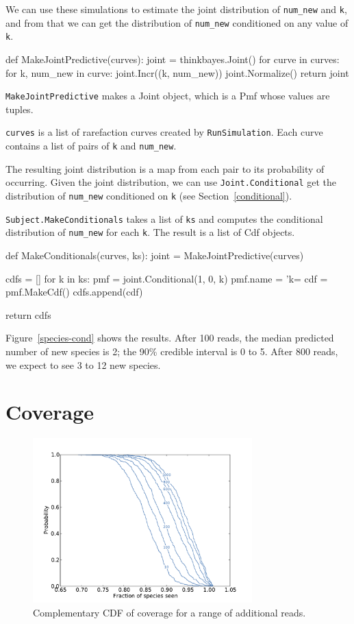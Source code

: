 \documentclass[12pt]{book}
\theoremstyle{exercise}
\begin{document}
We can use these simulations to estimate the
joint distribution of \verb"num_new" and {\tt k}, and from that
we can get the distribution of \verb"num_new" conditioned on any
value of {\tt k}.

\begin{code}
def MakeJointPredictive(curves):
    joint = thinkbayes.Joint()
    for curve in curves:
        for k, num_new in curve:
            joint.Incr((k, num_new))
    joint.Normalize()
    return joint
\end{code}

{\tt MakeJointPredictive} makes a Joint object, which is a
Pmf whose values are tuples.

{\tt curves} is a list of rarefaction curves created by
{\tt RunSimulation}.  Each curve contains a list of pairs of
{\tt k} and \verb"num_new".

The resulting joint distribution is a map from each pair to
its probability of occurring.  Given the joint distribution, we
can use {\tt Joint.Conditional}
get the distribution of \verb"num_new" conditioned on {\tt k}
(see Section~\ref{conditional}).

{\tt Subject.MakeConditionals} takes a list of {\tt ks}
and computes the conditional distribution of \verb"num_new"
for each {\tt k}.  The result is a list of Cdf objects.

\begin{code}
def MakeConditionals(curves, ks):
    joint = MakeJointPredictive(curves)

    cdfs = []
    for k in ks:
        pmf = joint.Conditional(1, 0, k)
        pmf.name = 'k=%
        cdf = pmf.MakeCdf()
        cdfs.append(cdf)

    return cdfs
\end{code}

Figure~\ref{species-cond} shows the results.  After 100 reads, the
median predicted number of new species is 2; the 90\% credible
interval is 0 to 5.  After 800 reads, we expect to see 3 to 12 new
species.


\section{Coverage}

\begin{figure}
\centerline{\includegraphics[height=2.5in]{figs/species-frac-B1242.pdf}}
\caption{Complementary CDF of coverage for a range of additional reads.}
\label{species-frac}
\end{figure}
\end{document}
